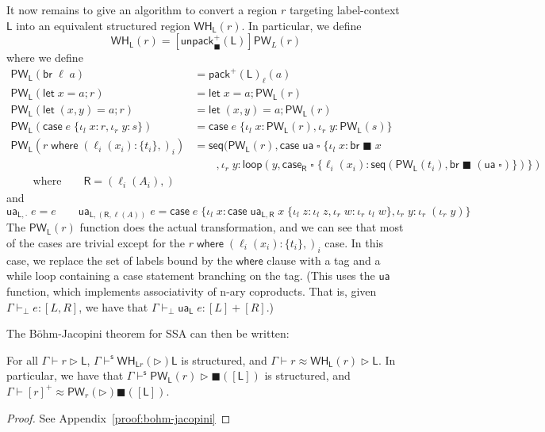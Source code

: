 \documentclass[acmsmall,screen,review]{acmart}
\newcommand{\ms}[1]{\ensuremath{\mathsf{#1}}}
\newcommand{\lto}{:}
\newcommand{\linl}[1]{\iota_l\;{#1}}
\newcommand{\linr}[1]{\iota_r\;{#1}}
\newcommand{\caseexpr}[5]{\ms{case}\;#1\;\{\linl{#2} \lto #3, \linr{#4} \lto #5\}}
\newcommand{\letstmt}[3]{\ensuremath{\ms{let}\;#1 = #2; #3}}
\newcommand{\brb}[2]{\ms{br}\;#1\;#2}
\newcommand{\casestmt}[5]{\ms{case}\;#1\;\{\linl{#2} \lto #3, \linr{#4} \lto #5\}}
\newcommand{\where}[2]{#1\;\ms{where}\;#2}
\newcommand{\wbranch}[3]{#1(#2) \lto \{#3\}}
\newcommand{\hasty}[4]{#1 \vdash_{#2} #3: {#4}}
\newcommand{\haslb}[3]{#1 \vdash #2 \rhd #3}
\newcommand{\shaslb}[3]{#1 \vdash^{\ms{s}} #2 \rhd #3}
\newcommand{\teqv}{\approx}
\newcommand{\lbeq}[4]{#1 \vdash #2 \teqv #3 \rhd {#4}}
\newcommand{\towhile}[2]{\ms{WH}_{#1}(#2)}
\newcommand{\topwhile}[2]{\ms{PW}_{#1}(#2)}
\newcommand{\invar}{\square}
\newcommand{\outlb}{\blacksquare}
\begin{document}
It now remains to give an algorithm to convert a region $r$ targeting label-context $\ms{L}$ into an
equivalent structured region $\towhile{\ms{L}}{r}$. In particular, we define
\begin{equation}
  \towhile{\ms{L}}{r} = [\ms{unpack}^+_\outlb(\ms{L})]\topwhile{L}{r}
\end{equation}
where we define
\begin{equation}
  \begin{aligned}
    \topwhile{\ms{L}}{\ms{br}\;\ell\;a} &= \ms{pack}^+(\ms{L})_\ell(a) \\
    \topwhile{\ms{L}}{\letstmt{x}{a}{r}} &= \letstmt{x}{a}{\topwhile{\ms{L}}{r}} \\
    \topwhile{\ms{L}}{\letstmt{(x, y)}{a}{r}} &= \letstmt{(x, y)}{a}{\topwhile{\ms{L}}{r}} \\
    \topwhile{\ms{L}}{\casestmt{e}{x}{r}{y}{s}} 
      &= \casestmt{e}{x}{\topwhile{\ms{L}}{r}}{y}{\topwhile{\ms{L}}{s}} \\
    \topwhile{\ms{L}}{\where{r}{(\wbranch{\ell_i}{x_i}{t_i},)_i}} 
      &=
      \ms{seq}(\topwhile{\ms{L}}{r}, \caseexpr{\ms{ua}\;\invar}{x}{\brb{\outlb}{x}\\ & \qquad}{y}
        {\ms{loop}(y, 
        \ms{case}_{\ms{R}}\;\invar\;
          \{\ell_i(x_i) : \ms{seq}(\topwhile{\ms{L}}{t_i}, \brb{\outlb}{(\ms{ua}\;\invar)}\})})
      \\ \qquad \text{where} \qquad \ms{R} = (\ell_i(A_i),)
  \end{aligned}
\end{equation}
and
\begin{equation}
  \ms{ua}_{\ms{L}, \cdot}\;e = e \qquad
  \ms{ua}_{\ms{L}, (\ms{R}, \ell(A))}\;e 
    = \caseexpr{e}{x}{
        \caseexpr{\ms{ua}_{\ms{L}, \ms{R}}\;x}{z}{\iota_l\;z}{w}{\iota_r\;\iota_l\;w}}
        {y}{\iota_r\;(\iota_r\;y)}
\end{equation}
%
The $\topwhile{\ms{L}}{r}$ function does the actual transformation, and we can see that most of the
cases are trivial except for the $\where{r}{(\wbranch{\ell_i}{x_i}{t_i},)_i}$ case. In this case, we replace the set of labels bound
by the $\ms{where}$ clause with a tag and a while loop containing a case statement branching on the
tag. (This uses the $\ms{ua}$ function, which implements associativity of n-ary coproducts. That is, 
given $\hasty{\Gamma}{\bot}{e}{[L, R]}$, we have that
$\hasty{\Gamma}{\bot}{\ms{ua}_{\ms{L}}\;e}{[L] + [R]}$.)

The B\"ohm-Jacopini theorem for SSA can then
be written:
\begin{theorem}[name=B\"ohm-Jacopini for SSA, restate=bohmjacopini]
  For all $\haslb{\Gamma}{r}{\ms{L}}$, $\shaslb{\Gamma}{\towhile{\ms{L}{r}}}{\ms{L}}$ is structured,
  and $\lbeq{\Gamma}{r}{\towhile{\ms{L}}{r}}{\ms{L}}$. In particular, we have that
  $\shaslb{\Gamma}{\topwhile{\ms{L}}{r}}{\outlb([\ms{L}])}$ is structured, and
  $\lbeq{\Gamma}{[r]^+}{\topwhile{r}}{\outlb([\ms{L}])}$.
\end{theorem}
\begin{proof}
  See Appendix~\ref{proof:bohm-jacopini}
\end{proof}
\end{document}
